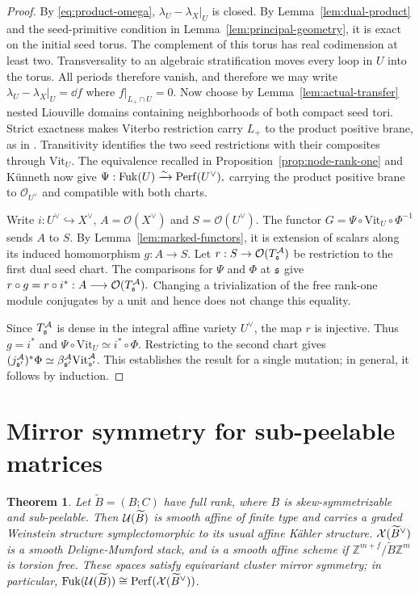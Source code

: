 \documentclass[12pt, letter]{amsart}
\newtheorem{theorem}{Theorem}[section]
\theoremstyle{definition}
\newcommand{\Z}{\mathbb Z}
\newcommand{\OO}{\mathcal O}
\numberwithin{equation}{section}
\begin{document}
\begin{proof}
By \eqref{eq:product-omega}, $\lambda_U-\lambda_X|_U$ is closed.
By Lemma~\ref{lem:dual-product} and the seed-primitive condition in
Lemma~\ref{lem:principal-geometry}, it is exact on the initial seed torus.
The complement of this torus has real codimension at least two.
Transversality to an algebraic stratification moves every loop in $U$ into the torus.
All periods therefore vanish, and therefore we may write
$\lambda_U-\lambda_X|_U=\dd f$ where $f|_{L_+\cap U}=0$.
Now choose by
Lemma~\ref{lem:actual-transfer}  nested Liouville domains containing
neighborhoods of both compact seed tori.
Strict exactness makes Viterbo restriction carry $L_+$ to the product positive brane,
as in \cite[Lemma~5.8]{HS}.
Transitivity identifies the two seed restrictions with their composites through
$\mathrm{Vit}_U$.
The equivalence recalled in Proposition~\ref{prop:node-rank-one} and K\"unneth \cite[Theorem~1.5]{GPS} now give
$
 \Psi:\operatorname{Fuk}(U)\xrightarrow{\sim}\mathrm{Perf}(U^\vee),
$
carrying the product positive brane to $\OO_{U^\vee}$ and compatible with both charts.

Write $i:U^\vee\hookrightarrow X^\vee$, $A=\OO(X^\vee)$ and $S=\OO(U^\vee)$.
The functor $G=\Psi\circ\mathrm{Vit}_U\circ\Phi^{-1}$ sends $A$ to $S$.
By Lemma~\ref{lem:marked-functors}, it is extension of scalars along
its induced homomorphism $g:A\to S$.
Let $r:S\to\OO(T_{\fs}^{\cA})$ be restriction to the first dual seed chart.
The comparisons for $\Psi$ and $\Phi$ at $\mathfrak{s}$ give
$
 r\circ g=r\circ i^*:A\longrightarrow\OO(T_{\fs}^{\cA}).
$
Changing a trivialization of the free rank-one module conjugates by a unit
and hence does not change this equality.

Since $T_{\mathfrak{s}}^{\mathcal{A}}$ is dense in the integral affine variety $U^\vee$,
the map $r$ is injective. Thus $g=i^*$ and
$\Psi\circ\mathrm{Vit}_U\simeq i^*\circ\Phi$.
Restricting to the second chart gives
$(j_{\mathfrak{s}'}^{\mathcal{A}})^*\Phi\simeq\beta_{\mathfrak{s}'}^{\mathcal{A}}\mathrm{Vit}_{\mathfrak{s}'}^{\mathcal{A}}$.  This establishes the result for a single mutation; in general, it follows by induction.
\end{proof}




\section{Mirror symmetry for sub-peelable matrices}
\label{sec:HMS}

\begin{theorem}\label{thm:sub-peelable}
Let $\widetilde B=(B;C)$ have full rank, where $B$ is
skew-symmetrizable and sub-peelable.
Then $\mathcal{U}(\widetilde B)$ is smooth affine of finite type and
carries a graded Weinstein structure symplectomorphic to its
usual affine K\"ahler structure. $\mathcal{X}(\widetilde B^\vee)$ is a smooth Deligne-Mumford stack, and is a smooth affine scheme if $\Z^{m+f}/\widetilde B \Z^m$ is torsion free.   These spaces satisfy equivariant cluster mirror symmetry; in particular, $\operatorname{Fuk}(\mathcal{U}(\widetilde B)) \cong \mathrm{Perf}(\mathcal{X}(\widetilde B^\vee))$. 
\end{theorem}
\end{document}
